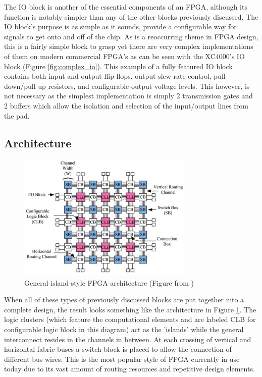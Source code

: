 \documentclass[12pt]{article}
\begin{document}
The IO block is another of the essential components of an FPGA, although its function
is notably simpler than any of the other blocks previously discussed. The IO block's
purpose is as simple as it sounds, provide a configurable way for signals to get onto and off of
the chip. As is a reoccurring theme in FPGA design, this is a fairly simple block to
grasp yet there are very complex implementations of them on modern commercial FPGA's
as can be seen with the XC4000's IO block (Figure \ref{fig:complex_io}). This example of
a fully featured IO block contains both input and output flip-flops, output slew rate
control, pull down/pull up resistors, and configurable output voltage levels. This
however, is not necessary as the simplest implementation is simply 2 transmission gates
and 2 buffers which allow the isolation and selection of the input/output lines from
the pad.

\subsection{Architecture} \label{Architecture}

\begin{figure}[ht]
    \centering
    \includegraphics[width=0.75\textwidth]{generalarch}
    \caption{General island-style FPGA architecture (Figure from \cite{fpga_arch_overview})}
    \label{fig:island_style}
\end{figure}

When all of these types of previously discussed blocks are put together into a complete
design, the result looks something like the architecture in Figure \ref{fig:island_style}.
The logic clusters (which
feature the computational elements and are labeled CLB for configurable logic block in this
 diagram) act as the 'islands' while the general interconnect
resides in the channels in between. At each crossing of vertical and horizontal fabric
buses a switch block is placed to allow the connection of different bus wires. This is
the most popular style of FPGA currently in use today due to its vast amount of routing
resources and repetitive design elements.
\end{document}
